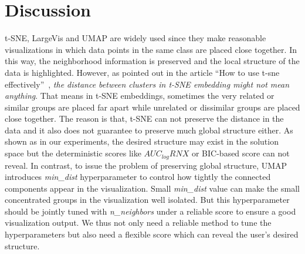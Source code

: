 \begin{figure*}%
    \centering
    \texttt{[image: \{NEURON\_1K\_score\_flexibility]}.png}
    \caption{Flexibility of $f_{score}$ for \emph{NEURON\_1K} dataset}
    \label{fig:flex:neuron}
\end{figure*}


\section{Discussion}\label{sec:discussion}

t-SNE, LargeVis and UMAP are widely used since they make reasonable visualizations in which data points in the same class are placed close together.
In this way, the neighborhood information is preserved and the local structure of the data is highlighted.
However, as pointed out in the article ``How to use t-sne effectively''~\cite{wattenberg2016use}, \emph{the distance between clusters in t-SNE embedding might not mean anything}.
That means in t-SNE embeddings, sometimes the very related or similar groups are placed far apart while unrelated or dissimilar groups are placed close together.
The reason is that, t-SNE can not preserve the distance in the data and it also does not guarantee to preserve much global structure either.
As shown as in our experiments, the desired structure may exist in the solution space but the deterministic scores like $AUC_{log}RNX$ or BIC-based score can not reveal.
In contrast, to issue the problem of preserving global structure, UMAP introduces \emph{min\_dist} hyperparameter to control how tightly the connected components appear in the visualization.
Small \emph{min\_dist} value can make the small concentrated groups in the visualization well isolated.
But this hyperparameter should be jointly tuned with \emph{n\_neighbors} under a reliable score to ensure a good visualization output.
We thus not only need a reliable method to tune the hyperparameters but also need a flexible score which can reveal the user's desired structure.


